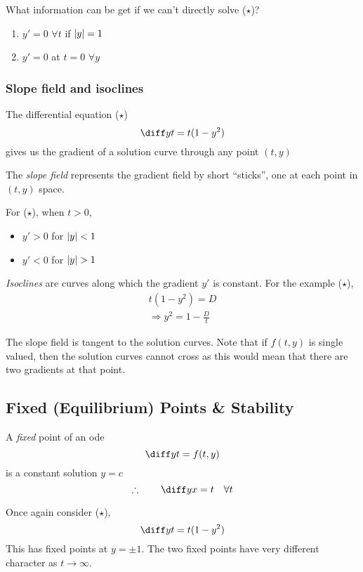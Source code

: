\documentclass{article}
\begin{document}
\begin{remark}
    What information can be get if we can't directly solve ($\star$)?
    \begin{enumerate}
        \item $y' = 0$ $\forall t$ if $\left\lvert y\right\rvert = 1$
        \item $y' = 0$ at $t = 0$ $\forall y$
    \end{enumerate}
\end{remark}

\subsubsection{Slope field and isoclines}
The differential equation ($\star$)
\[
    \diff yt = t(1 - y^2)
\]
gives us the gradient of a solution curve through any point $(t, y)$

\begin{defi}
    The \emph{slope field} represents the gradient field by short ``sticks'', one at each point in $(t, y)$ space.
\end{defi}
\begin{eg}
    For ($\star$), when $t > 0$,
    \begin{itemize}
        \item $y' > 0$ for $\left\lvert y\right\rvert < 1$
        \item $y' < 0$ for $\left\lvert y\right\rvert > 1$
    \end{itemize} 
\end{eg}

\begin{defi}[Isoclines]
    \emph{Isoclines} are curves along which the gradient $y'$ is constant.
    For the example ($\star$), 
    \begin{align*}
        t(1-y^2) = D \\
        \Rightarrow y^2 = 1 - \frac{D}{t}
    \end{align*}
\end{defi}
\begin{remark}
    The slope field is tangent to the solution curves.
    Note that if $f(t, y)$ is single valued, then the solution curves cannot cross as this would mean that there are two gradients at that point.
\end{remark}

\subsection{Fixed (Equilibrium) Points \& Stability}
\begin{defi}
    A \emph{fixed} point of an ode
    \[
        \diff yt = f(t,y)   
    \]
    is a constant solution $y = c$
    \[
        \therefore \qquad \diff yx = t \quad \forall t  
    \]
\end{defi}
\begin{eg}
    Once again consider ($\star$),
    \[
        \diff yt = t(1 - y^2)  
    \]
    This has fixed points at $y = \pm 1$.
    The two fixed points have very different character as $t \rightarrow \infty$.
\end{eg}
\end{document}
